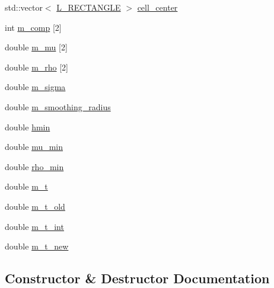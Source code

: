 \begin{DoxyCompactItemize}
\item 
std\+::vector$<$ \hyperlink{class_l___r_e_c_t_a_n_g_l_e}{L\+\_\+\+R\+E\+C\+T\+A\+N\+G\+LE} $>$ \hyperlink{class_incompress___solver___smooth___basis_a38f7b6f97b13c2ddc8551cce46b99cf8}{cell\+\_\+center}
\item 
int \hyperlink{class_incompress___solver___smooth___basis_af5728d3f5f062bd724d0b06e50f07df0}{m\+\_\+comp} \mbox{[}2\mbox{]}
\item 
double \hyperlink{class_incompress___solver___smooth___basis_a5e0e511ab568cfcfac643285cd1558e0}{m\+\_\+mu} \mbox{[}2\mbox{]}
\item 
double \hyperlink{class_incompress___solver___smooth___basis_aa16db88edf1a6afa4e84b9d2b2dd5c8b}{m\+\_\+rho} \mbox{[}2\mbox{]}
\item 
double \hyperlink{class_incompress___solver___smooth___basis_a597f3989985b6e0beae0e509ee95b6d5}{m\+\_\+sigma}
\item 
double \hyperlink{class_incompress___solver___smooth___basis_a4bd26e5308fc79ccabc0d12e24807434}{m\+\_\+smoothing\+\_\+radius}
\item 
double \hyperlink{class_incompress___solver___smooth___basis_a066845265506ae00d2f2726ef71598b5}{hmin}
\item 
double \hyperlink{class_incompress___solver___smooth___basis_aedf1ab3a1d4d10e395cbc0d1a7cc58d5}{mu\+\_\+min}
\item 
double \hyperlink{class_incompress___solver___smooth___basis_afcd9f652c0b73b1650f5690855790f8f}{rho\+\_\+min}
\item 
double \hyperlink{class_incompress___solver___smooth___basis_aae21fd7692451705730f6bf9d6d5d66f}{m\+\_\+t}
\item 
double \hyperlink{class_incompress___solver___smooth___basis_ab057e99c6fb150ea8994597fe91fa6e4}{m\+\_\+t\+\_\+old}
\item 
double \hyperlink{class_incompress___solver___smooth___basis_afaf9f90bca296738495dbd2d3816b405}{m\+\_\+t\+\_\+int}
\item 
double \hyperlink{class_incompress___solver___smooth___basis_a0a5ce1c4b184f360e5e9bc27d9dfb1d3}{m\+\_\+t\+\_\+new}
\end{DoxyCompactItemize}


\subsection{Constructor \& Destructor Documentation}
